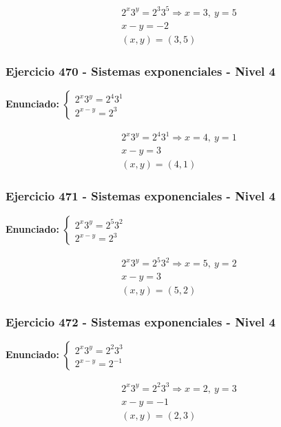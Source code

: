 \documentclass[12pt,a4paper]{article}
\begin{document}
\[
\begin{aligned}
2^x3^y=2^{3}3^{5}\Rightarrow x=3,\ y=5\\
x-y=-2\\
\boxed{(x,y)=(3,5)}
\end{aligned}
\]


\subsubsection*{Ejercicio 470 - Sistemas exponenciales - Nivel 4}
\textbf{Enunciado:} \(\begin{cases} 2^x3^y=2^{4}3^{1}\\ 2^{x-y}=2^{3}\end{cases}\)

\[
\begin{aligned}
2^x3^y=2^{4}3^{1}\Rightarrow x=4,\ y=1\\
x-y=3\\
\boxed{(x,y)=(4,1)}
\end{aligned}
\]


\subsubsection*{Ejercicio 471 - Sistemas exponenciales - Nivel 4}
\textbf{Enunciado:} \(\begin{cases} 2^x3^y=2^{5}3^{2}\\ 2^{x-y}=2^{3}\end{cases}\)

\[
\begin{aligned}
2^x3^y=2^{5}3^{2}\Rightarrow x=5,\ y=2\\
x-y=3\\
\boxed{(x,y)=(5,2)}
\end{aligned}
\]


\subsubsection*{Ejercicio 472 - Sistemas exponenciales - Nivel 4}
\textbf{Enunciado:} \(\begin{cases} 2^x3^y=2^{2}3^{3}\\ 2^{x-y}=2^{-1}\end{cases}\)

\[
\begin{aligned}
2^x3^y=2^{2}3^{3}\Rightarrow x=2,\ y=3\\
x-y=-1\\
\boxed{(x,y)=(2,3)}
\end{aligned}
\]
\end{document}
